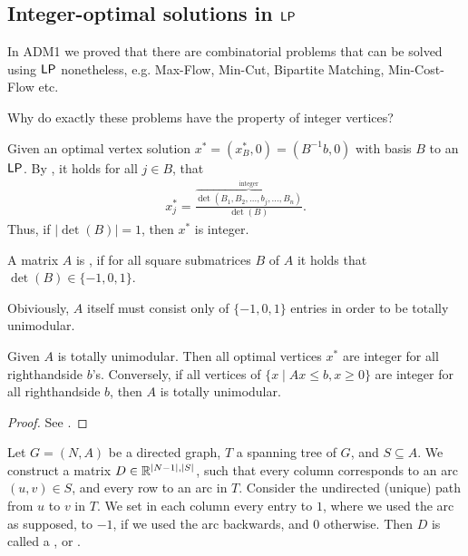 \subsection{Integer-optimal solutions in $\mathsf{LP}$}
\begin{recall}
    In ADM1 we proved that there are combinatorial problems that can be solved using $\mathsf{LP}$ nonetheless, e.g.
    Max-Flow, Min-Cut, Bipartite Matching, Min-Cost-Flow etc.
\end{recall}
\begin{question}
    Why do exactly these problems have the property of integer vertices?
\end{question}
Given an optimal vertex solution $x^*=(x_B^*,0)=(B^{-1}b,0)$ with basis $B$ to an $\mathsf{LP}$.
By , it holds for all $j \in B$, that
\begin{align*}
    x_j^* = \frac{\overbrace{\det(B_1,B_2,...,b_j,...,B_n)}^{\text{integer}}}{\det(B)}.
\end{align*}
Thus, if $|\det(B)|=1$, then $x^*$ is integer.
\begin{definition}
    A matrix $A$ is , if for all square submatrices $B$ of $A$ it holds
    that $\det(B) \in \{-1,0,1\}$.
\end{definition}
\begin{note}
    Obiviously, $A$ itself must consist only of $\{-1,0,1\}$ entries in order to be totally unimodular.
\end{note}
\begin{theorem}
    Given $A$ is totally unimodular. Then all optimal vertices $x^*$ are integer for all righthandside $b$'s.
    Conversely, if all vertices of $\{x \mid Ax\leq b, x \geq 0\}$ are integer for all righthandside $b$, then $A$ is totally unimodular.
\end{theorem}
\begin{proof}
    See \cite[Thm~2.5~III~1.2]{int-comb-optimization}.
\end{proof}
\begin{definition}
    Let $G=(N,A)$ be a directed graph, $T$ a spanning tree of $G$,
    and $S \subseteq A$. We construct a matrix $D \in \mathbb{R}^{|N-1|,|S|}$,
    such that every column corresponds to an arc $(u,v) \in S$, and every row to an arc in $T$.
    Consider the undirected (unique) path from $u$ to $v$ in $T$.
    We set in each column every entry to $1$, where we used the arc as supposed, to $-1$, if we used the arc backwards, and $0$ otherwise.
    Then $D$ is called a , or .
\end{definition}
